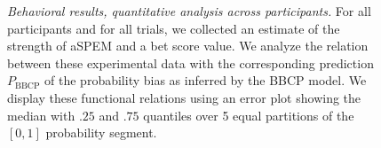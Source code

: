 \documentclass[12pt,english]{article}%
\newcommand{\seeFig}[1]{Figure~\ref{fig:#1}}
\begin{document}
\begin{figure}%
\caption{%
\emph{Behavioral results, quantitative analysis across participants.} %
For all participants and for all trials, we collected an estimate of
the strength of aSPEM and a bet score value.
We analyze the relation between these experimental data with the corresponding prediction $P_{\text{BBCP}}$
of the probability bias as inferred by the BBCP model.
We display these functional relations 
using an error plot showing the median with $.25$ and $.75$ quantiles
over 5 equal partitions of the $[0, 1]$ probability segment.
}
\end{figure}
\end{document}

